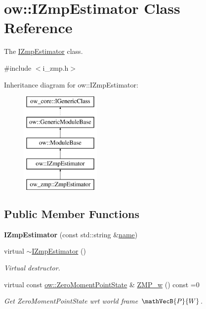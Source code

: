 \hypertarget{classow_1_1IZmpEstimator}{}\section{ow\+:\+:I\+Zmp\+Estimator Class Reference}
\label{classow_1_1IZmpEstimator}


The \hyperlink{classow_1_1IZmpEstimator}{I\+Zmp\+Estimator} class.  




{\ttfamily \#include $<$i\+\_\+zmp.\+h$>$}

Inheritance diagram for ow\+:\+:I\+Zmp\+Estimator\+:\begin{figure}[H]
\begin{center}
\leavevmode
\includegraphics[height=5.000000cm]{d8/d03/classow_1_1IZmpEstimator}
\end{center}
\end{figure}
\subsection*{Public Member Functions}
\begin{DoxyCompactItemize}
\item 
{\bfseries I\+Zmp\+Estimator} (const std\+::string \&\hyperlink{classow_1_1GenericModuleBase_a4b712883728cdbab7779e27f9a23689c}{name})\hypertarget{classow_1_1IZmpEstimator_a63183fdf463e3571bf2cd95f579e2453}{}\label{classow_1_1IZmpEstimator_a63183fdf463e3571bf2cd95f579e2453}

\item 
virtual \hyperlink{classow_1_1IZmpEstimator_a4df3d67cde8742cc9bd86b5c106c05b2}{$\sim$\+I\+Zmp\+Estimator} ()\hypertarget{classow_1_1IZmpEstimator_a4df3d67cde8742cc9bd86b5c106c05b2}{}\label{classow_1_1IZmpEstimator_a4df3d67cde8742cc9bd86b5c106c05b2}

\begin{DoxyCompactList}\small\item\em Virtual destructor. \end{DoxyCompactList}\item 
virtual const \hyperlink{classow__core_1_1ZeroMomentPointState}{ow\+::\+Zero\+Moment\+Point\+State} \& \hyperlink{classow_1_1IZmpEstimator_a700ce61e3cb24853273fedaa253e09d3}{Z\+M\+P\+\_\+w} () const =0
\begin{DoxyCompactList}\small\item\em Get Zero\+Moment\+Point\+State wrt world frame $ \mathVecB{P}{W} $. \end{DoxyCompactList}\end{DoxyCompactItemize}
